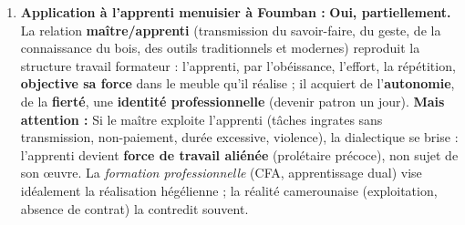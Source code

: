 \documentclass[11pt]{article}
\begin{document}
\begin{corrige}
\begin{enumerate}
\item \textbf{Application à l'apprenti menuisier à Foumban :} \textbf{Oui, partiellement.} La relation \textbf{maître/apprenti} (transmission du savoir-faire, du geste, de la connaissance du bois, des outils traditionnels et modernes) reproduit la structure \guillemotleft travail formateur \guillemotright : l'apprenti, par l'obéissance, l'effort, la répétition, \textbf{objective sa force} dans le meuble qu'il réalise ; il acquiert de l'\textbf{autonomie}, de la \textbf{fierté}, une \textbf{identité professionnelle} (devenir \guillemotleft patron \guillemotright un jour). \textbf{Mais attention :} Si le maître exploite l'apprenti (tâches ingrates sans transmission, non-paiement, durée excessive, violence), la dialectique se brise : l'apprenti devient \textbf{force de travail aliénée} (prolétaire précoce), non sujet de son œuvre. La \emph{formation professionnelle} (CFA, apprentissage dual) vise idéalement la réalisation hégélienne ; la réalité camerounaise (exploitation, absence de contrat) la contredit souvent.
\end{enumerate}
\end{corrige}
\end{document}
